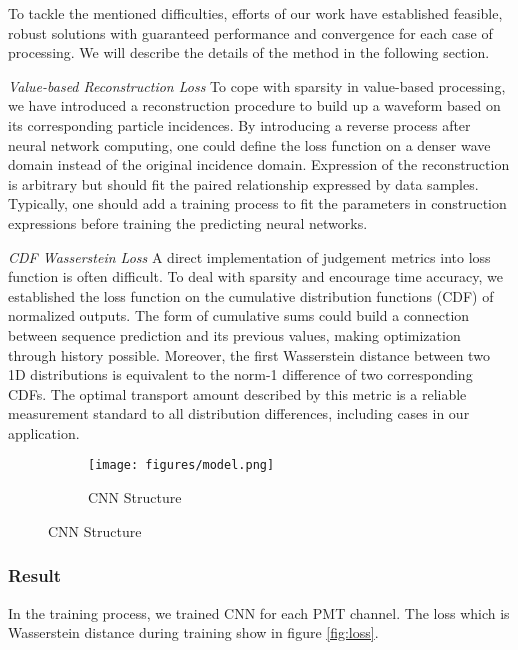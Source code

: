 To tackle the mentioned difficulties, efforts of our work have established feasible, robust solutions with guaranteed performance and convergence for each case of processing. We will describe the details of the method in the following section.

\emph{Value-based Reconstruction Loss}
To cope with sparsity in value-based processing, we have introduced a reconstruction procedure to build up a waveform based on its corresponding particle incidences. By introducing a reverse process after neural network computing, one could define the loss function on a denser wave domain instead of the original incidence domain. Expression of the reconstruction is arbitrary but should fit the paired relationship expressed by data samples. Typically, one should add a training process to fit the parameters in construction expressions before training the predicting neural networks.

\emph{CDF Wasserstein Loss}
A direct implementation of judgement metrics into loss function is often difficult. To deal with sparsity and encourage time accuracy, we established the loss function on the cumulative distribution functions (CDF) of normalized outputs. The form of cumulative sums could build a connection between sequence prediction and its previous values, making optimization through history possible. Moreover, the first Wasserstein distance between two 1D distributions is equivalent to the norm-1 difference of two corresponding CDFs. The optimal transport amount described by this metric is a reliable measurement standard to all distribution differences, including cases in our application.

\begin{figure}[H]
\begin{minipage}{.3\textwidth}
\begin{figure}[H]
    \centering
    \texttt{[image: figures/model.png]}
    \caption{\label{fig:struct} CNN Structure}
\end{figure}
\end{minipage}
\hspace{4mm}
\begin{minipage}{.7\textwidth}

\end{minipage}
\end{figure}

\subsubsection{Result}
In the training process, we trained CNN for each PMT channel. The loss which is Wasserstein distance during training show in figure \ref{fig:loss}. 

